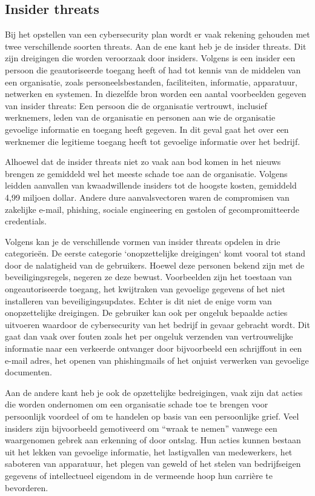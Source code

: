 \subsection{Insider threats}
Bij het opstellen van een cybersecurity plan wordt er vaak rekening gehouden met twee verschillende soorten threats. Aan de ene kant heb je de insider threats. Dit zijn dreigingen die worden veroorzaak door insiders. Volgens \textcite{Cisa2025} is een insider een persoon die geautoriseerde toegang heeft of had tot kennis van de middelen van een organisatie, zoals personeelsbestanden, faciliteiten, informatie, apparatuur, netwerken en systemen. In diezelfde bron worden een aantal voorbeelden gegeven van insider threats: Een persoon die de organisatie vertrouwt, inclusief werknemers, leden van de organisatie en personen aan wie de organisatie gevoelige informatie en toegang heeft gegeven. In dit geval gaat het over een werknemer die legitieme toegang heeft tot gevoelige informatie over het bedrijf.

Alhoewel dat de insider threats niet zo vaak aan bod komen in het nieuws brengen ze gemiddeld wel het meeste schade toe aan de organisatie. Volgens \textcite{ibm2024} leidden aanvallen van kwaadwillende insiders tot de hoogste kosten, gemiddeld 4,99 miljoen dollar. Andere dure aanvalsvectoren waren de compromisen van zakelijke e-mail, phishing, sociale engineering en gestolen of gecompromitteerde credentials. 

Volgens \textcite{Cisa2025} kan je de verschillende vormen van insider threats opdelen in drie categorieën. De eerste categorie `onopzettelijke dreigingen` komt vooral tot stand door de nalatigheid van de gebruikers.  Hoewel deze personen bekend zijn met de beveiligingsregels, negeren ze deze bewust. Voorbeelden zijn het toestaan van ongeautoriseerde toegang, het kwijtraken van gevoelige gegevens of het niet installeren van beveiligingsupdates. Echter is dit niet de enige vorm van onopzettelijke dreigingen. De gebruiker kan ook per ongeluk bepaalde acties uitvoeren waardoor de cybersecurity van het bedrijf in gevaar gebracht wordt. Dit gaat dan vaak over fouten zoals het per ongeluk verzenden van vertrouwelijke informatie naar een verkeerde ontvanger door bijvoorbeeld een schrijffout in een e-mail adres, het openen van phishingmails of het onjuist verwerken van gevoelige documenten.

Aan de andere kant heb je ook de opzettelijke bedreigingen, vaak zijn dat acties die worden ondernomen om een organisatie schade toe te brengen voor persoonlijk voordeel of om te handelen op basis van een persoonlijke grief. Veel insiders zijn bijvoorbeeld gemotiveerd om “wraak te nemen” vanwege een waargenomen gebrek aan erkenning of door ontslag. Hun acties kunnen bestaan uit het lekken van gevoelige informatie, het lastigvallen van medewerkers, het saboteren van apparatuur, het plegen van geweld of het stelen van bedrijfseigen gegevens of intellectueel eigendom in de vermeende hoop hun carrière te bevorderen.\autocite{Cisa2025}

